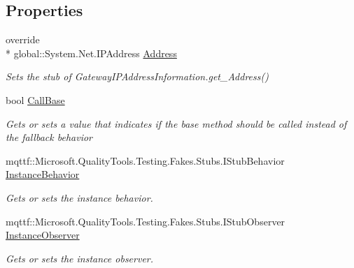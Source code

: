 \subsection*{Properties}
\begin{DoxyCompactItemize}
\item 
override \\*
global\-::\-System.\-Net.\-I\-P\-Address \hyperlink{class_system_1_1_net_1_1_network_information_1_1_fakes_1_1_stub_gateway_i_p_address_information_a3849b9cd0bcf49d545ff2bc1c48028d1}{Address}
\begin{DoxyCompactList}\small\item\em Sets the stub of Gateway\-I\-P\-Address\-Information.\-get\-\_\-\-Address()\end{DoxyCompactList}\item 
bool \hyperlink{class_system_1_1_net_1_1_network_information_1_1_fakes_1_1_stub_gateway_i_p_address_information_a880d76a763481489a494e99903f1416b}{Call\-Base}
\begin{DoxyCompactList}\small\item\em Gets or sets a value that indicates if the base method should be called instead of the fallback behavior\end{DoxyCompactList}\item 
mqttf\-::\-Microsoft.\-Quality\-Tools.\-Testing.\-Fakes.\-Stubs.\-I\-Stub\-Behavior \hyperlink{class_system_1_1_net_1_1_network_information_1_1_fakes_1_1_stub_gateway_i_p_address_information_a73cba9e166b9dd22362dda58c80192fd}{Instance\-Behavior}
\begin{DoxyCompactList}\small\item\em Gets or sets the instance behavior.\end{DoxyCompactList}\item 
mqttf\-::\-Microsoft.\-Quality\-Tools.\-Testing.\-Fakes.\-Stubs.\-I\-Stub\-Observer \hyperlink{class_system_1_1_net_1_1_network_information_1_1_fakes_1_1_stub_gateway_i_p_address_information_ad49e8aa329c5b9b0bd51ceed0f347805}{Instance\-Observer}
\begin{DoxyCompactList}\small\item\em Gets or sets the instance observer.\end{DoxyCompactList}\end{DoxyCompactItemize}


